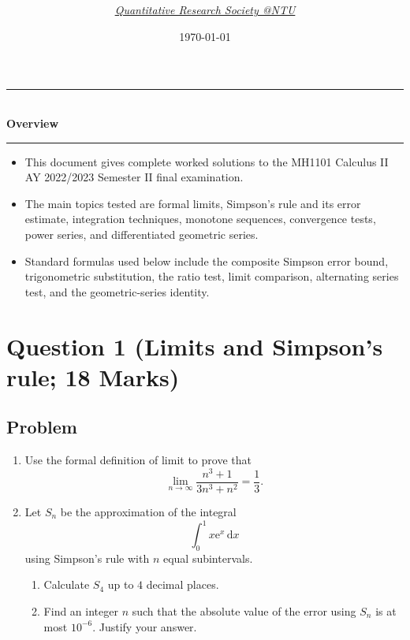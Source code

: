 \documentclass[12pt]{article}
\title{
\Huge \CourseCode\ \CourseName \\[0.3em]
\Large \DocType \\[0.3em]
\large \ExamMeta
}
\author{\textit{\href{https://qrsntu.org}{Quantitative Research Society @NTU}}}
\date{\today}
\newcommand{\dd}{\,\mathrm{d}}
\newcommand{\ee}{\mathrm{e}}
\newenvironment{overview}{
  \par\bigskip
  \begin{center}
    \rule{0.92\linewidth}{0.6pt}\\[-0.2em]
    \textbf{Overview}\\[-0.2em]
    \rule{0.92\linewidth}{0.6pt}
  \end{center}
  \vspace{-0.3em}
  \begin{itemize}[leftmargin=1.6em, itemsep=0.2em, topsep=0.2em]
}{
  \end{itemize}
  \par\bigskip
}
\begin{document}
\maketitle
\thispagestyle{plainfirst}
\pagestyle{main}

\begin{overview}
  \item This document gives complete worked solutions to the MH1101 Calculus II AY 2022/2023 Semester II final examination.
  \item The main topics tested are formal limits, Simpson's rule and its error estimate, integration techniques, monotone sequences, convergence tests, power series, and differentiated geometric series.
  \item Standard formulas used below include the composite Simpson error bound, trigonometric substitution, the ratio test, limit comparison, alternating series test, and the geometric-series identity.
\end{overview}

\newpage
\tableofcontents
\newpage

\section{Question 1 (Limits and Simpson's rule; 18 Marks)}

\subsection{Problem}

\begin{enumerate}[label=(\alph*)]
\item Use the formal definition of limit to prove that
\[
\lim_{n\to\infty}\frac{n^3+1}{3n^3+n^2}=\frac13.
\]

\item Let $S_n$ be the approximation of the integral
\[
\int_0^1 x\ee^x\dd x
\]
using Simpson's rule with $n$ equal subintervals.
\begin{enumerate}[label=(\roman*)]
\item Calculate $S_4$ up to $4$ decimal places.
\item Find an integer $n$ such that the absolute value of the error using $S_n$ is at most $10^{-6}$. Justify your answer.
\end{enumerate}
\end{enumerate}

\newpage
\end{document}
